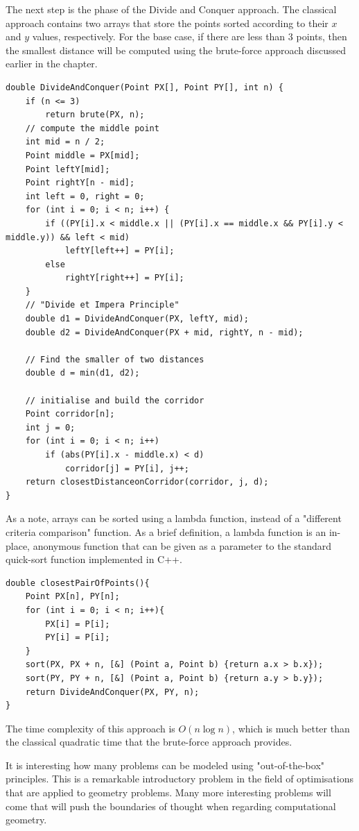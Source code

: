 \documentclass[letterpaper]{article}
\begin{document}
The next step is the phase of the Divide and Conquer approach. The classical approach contains two arrays that store the points sorted according to their $x$ and $y$ values, respectively. For the base case, if there are less than 3 points, then the smallest distance will be computed using the brute-force approach discussed earlier in the chapter.

\begin{lstlisting}
double DivideAndConquer(Point PX[], Point PY[], int n) {
    if (n <= 3)
        return brute(PX, n);
    // compute the middle point
    int mid = n / 2;
    Point middle = PX[mid];
    Point leftY[mid];
    Point rightY[n - mid];
    int left = 0, right = 0;
    for (int i = 0; i < n; i++) {
        if ((PY[i].x < middle.x || (PY[i].x == middle.x && PY[i].y < middle.y)) && left < mid)
            leftY[left++] = PY[i];
        else
            rightY[right++] = PY[i];
    }
    // "Divide et Impera Principle"
    double d1 = DivideAndConquer(PX, leftY, mid);
    double d2 = DivideAndConquer(PX + mid, rightY, n - mid);

    // Find the smaller of two distances
    double d = min(d1, d2);

    // initialise and build the corridor
    Point corridor[n];
    int j = 0;
    for (int i = 0; i < n; i++)
        if (abs(PY[i].x - middle.x) < d)
            corridor[j] = PY[i], j++;
    return closestDistanceonCorridor(corridor, j, d);
}
\end{lstlisting}

As a note, arrays can be sorted using a lambda function, instead of a "different criteria comparison" function. As a brief definition, a lambda function is an in-place, anonymous function that can be given as a parameter to the standard quick-sort function implemented in C++.

\begin{lstlisting}
double closestPairOfPoints(){
	Point PX[n], PY[n];
	for (int i = 0; i < n; i++){
		PX[i] = P[i];
		PY[i] = P[i];
	}
	sort(PX, PX + n, [&] (Point a, Point b) {return a.x > b.x});
	sort(PY, PY + n, [&] (Point a, Point b) {return a.y > b.y});
	return DivideAndConquer(PX, PY, n);
}
\end{lstlisting}

The time complexity of this approach is $O(n \log n)$, which is much better than the classical quadratic time that the brute-force approach provides.

It is interesting how many problems can be modeled using "out-of-the-box" principles. This is a remarkable introductory problem in the field of optimisations that are applied to geometry problems. Many more interesting problems will come that will push the boundaries of thought when regarding computational geometry.
\end{document}
